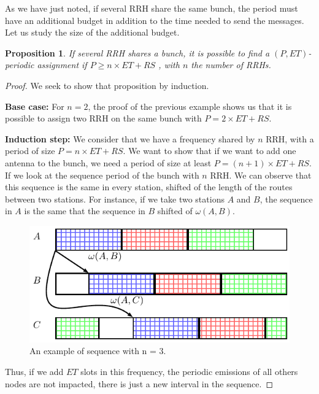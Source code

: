\documentclass[]{algotel}
\newtheorem{prop}{Proposition}
\begin{document}
 
 
 As we have just noted, if several RRH share the same bunch, the period must have an additional budget in addition to the time needed to send the messages. Let us study the size of the additional budget.
 \begin{prop}
 If several RRH shares a bunch, it is possible to find a $(P,ET)$-periodic assignment if $P \ge n\times ET + RS$ , with $n$ the number of RRHs.
 \end{prop}
 \begin{proof}
 We seek to show that proposition by induction.
 
 {\bf Base case:} For $n = 2$, the proof of the previous example shows us that it is possible to assign two RRH on the same bunch with $P = 2\times ET + RS$.
 
 {\bf Induction step:}  We consider that we have a frequency shared by $n$ RRH, with a period of size $P= n\times ET + RS$. We want to show that if we want to add one antenna to the bunch, we need a period of size at least $P = (n+1)\times ET + RS$. If we look at the sequence period of the bunch with $n$ RRH. We can observe that this sequence is the same in every station, shifted of the length of the routes between two stations. For instance, if we take two stations $A$ and $B$, the sequence in $A$ is the same that the sequence in $B$ shifted of $\omega(A,B)$.
 
   \begin{figure}[h]
\centering
      \includegraphics[scale=0.7]{period1.pdf}
     \caption{An example of sequence with n = 3.}   \label{fig:proofperiod1}
  \end{figure}
   
 Thus, if we add $ET$ slots in this frequency, the periodic emissions of all others nodes are not impacted, there is just a new interval in the sequence.
 

\end{proof}
\end{document}
